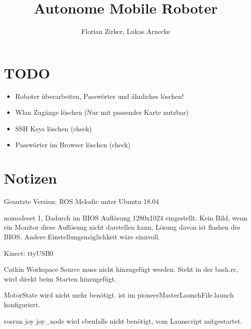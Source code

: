 \documentclass{scrartcl}%
\begin{document}
\titlehead{AMR}%
\subject{Projektbericht}%
\title{Autonome Mobile Roboter}%
\author{Florian Zirker, Lukas Arnecke}%
\publishers{Prof. Dr. Thomas Ihme}%
\maketitle%
\tableofcontents

\section{TODO}
\begin{itemize}
	\item Roboter überarbeiten, Passwörter und ähnliches löschen!
	\item Wlan Zugänge löschen (Nur mit passender Karte nutzbar)
	\item SSH Keys löschen (check)
	\item Passwörter im Browser löschen (check)
\end{itemize}
\section{Notizen}
Genutzte Version: ROS Melodic unter Ubuntu 18.04

nomodeset 1, Dadurch im BIOS Auflösung 1280x1024 eingestellt. Kein Bild, wenn ein Monitor diese Auflösung nicht darstellen kann. Lösung davon ist flashen des BIOS. Andere Einstellungsmöglichkeit wäre sinnvoll.

Kinect: ttyUSB0

Catkin Workspace Source muss nicht hinzugefügt werden. Steht in der bash.rc, wird direkt beim Starten hinzugefügt.

MotorState wird nicht mehr benötigt. ist im pioneerMasterLaunchFile.launch konfiguriert.

rosrun joy joy\_node wird ebenfalls nicht benötigt, vom Launscript mitgestartet.
\end{document}
